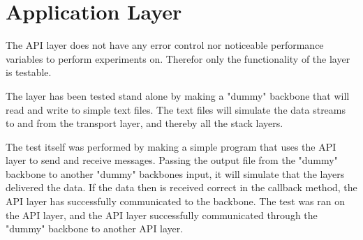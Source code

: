\section{Application Layer}

The API layer does not have any error control nor noticeable performance variables to perform experiments on. Therefor only the functionality of the layer is testable. 

The layer has been tested stand alone by making a "dummy" backbone that will read and write to simple text files. The text files will simulate the data streams to and from the transport layer, and thereby all the stack layers.


The test itself was performed by making a simple program that uses the API layer to send and receive messages. Passing the output file from the "dummy" backbone to another "dummy" backbones input, it will simulate that the layers delivered the data. If the data then is received correct in the callback method, the API layer has successfully communicated to the backbone. The test was ran on the API layer, and the API layer successfully communicated through the "dummy" backbone to another API layer.